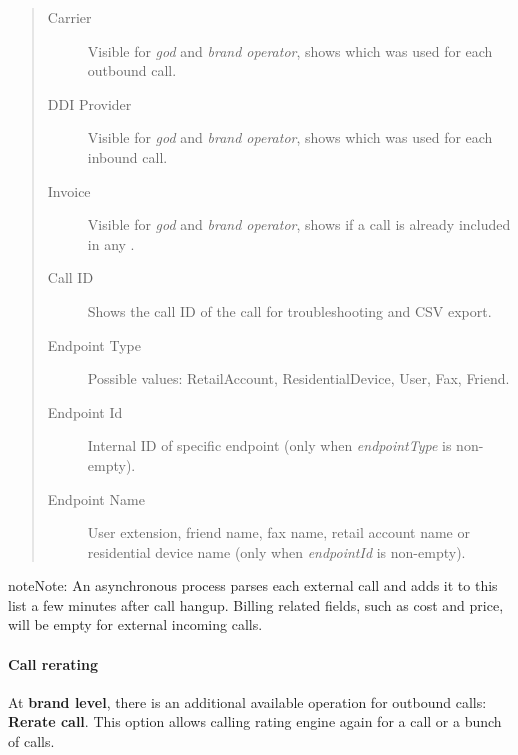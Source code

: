 \documentclass[letterpaper,10pt,english]{sphinxmanual}
\begin{document}
\begin{quote}
\begin{description}
\item[{Carrier}] \leavevmode
Visible for \emph{god} and \emph{brand operator}, shows which {\hyperref[administration_portal/brand/providers/carriers:carriers]{}} was used for each outbound call.

\item[{DDI Provider}] \leavevmode
Visible for \emph{god} and \emph{brand operator}, shows which {\hyperref[administration_portal/brand/providers/ddi_providers:ddi\string-providers]{}} was used for each inbound call.

\item[{Invoice}] \leavevmode
Visible for \emph{god} and \emph{brand operator}, shows if a call is already included in any {\hyperref[administration_portal/brand/invoicing/invoices:invoices]{}}.

\item[{Call ID}] \leavevmode
Shows the call ID of the call for troubleshooting and CSV export.

\item[{Endpoint Type}] \leavevmode
Possible values: RetailAccount, ResidentialDevice, User, Fax, Friend.

\item[{Endpoint Id}] \leavevmode
Internal ID of specific endpoint (only when \emph{endpointType} is non-empty).

\item[{Endpoint Name}] \leavevmode
User extension, friend name, fax name, retail account name or residential device name (only when \emph{endpointId} is non-empty).

\end{description}
\end{quote}

\begin{notice}{note}{Note:}
An asynchronous process parses each external call and adds it to this list a few minutes after call hangup. Billing related fields, such as cost and price, will be empty for external incoming calls.
\end{notice}


\paragraph{Call rerating}
\label{administration_portal/client/retail/calls/external_calls:call-rerating}
At \textbf{brand level}, there is an additional available operation for outbound calls: \textbf{Rerate call}. This option allows calling rating engine again for a call or a bunch of calls.
\end{document}
